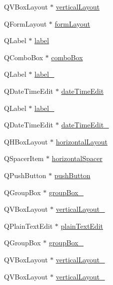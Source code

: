 \begin{DoxyCompactItemize}
\item 
Q\+V\+Box\+Layout $\ast$ \hyperlink{class_ui___client_view_a6df61dc527c8a16c99264dc76664a0e7}{vertical\+Layout}
\item 
Q\+Form\+Layout $\ast$ \hyperlink{class_ui___client_view_aeb4ca2ecc409a09602ed2d98d124a65f}{form\+Layout}
\item 
Q\+Label $\ast$ \hyperlink{class_ui___client_view_a65f087e517845c4943ada68765528b7c}{label}
\item 
Q\+Combo\+Box $\ast$ \hyperlink{class_ui___client_view_a4272861ad4c5565d62485516b5fc046f}{combo\+Box}
\item 
Q\+Label $\ast$ \hyperlink{class_ui___client_view_a4b3b712ef57c0b26b0cf24fb673ef215}{label\+\_}
\item 
Q\+Date\+Time\+Edit $\ast$ \hyperlink{class_ui___client_view_a3ca4d48937a0662ed8ec86ce0e31394f}{date\+Time\+Edit}
\item 
Q\+Label $\ast$ \hyperlink{class_ui___client_view_a4cc717778a48b972383c7e9c57c9312d}{label\+\_}
\item 
Q\+Date\+Time\+Edit $\ast$ \hyperlink{class_ui___client_view_a5da3b627c41c81ffd0cee3714f85bdfa}{date\+Time\+Edit\+\_}
\item 
Q\+H\+Box\+Layout $\ast$ \hyperlink{class_ui___client_view_a508aef0ee91fd84825dbc5c8aa7cdeb0}{horizontal\+Layout}
\item 
Q\+Spacer\+Item $\ast$ \hyperlink{class_ui___client_view_aa7dcb0d8ab4f0405994e9e0fa7e989c2}{horizontal\+Spacer}
\item 
Q\+Push\+Button $\ast$ \hyperlink{class_ui___client_view_ab0bc490a387f6e96e63bc12e2994fd13}{push\+Button}
\item 
Q\+Group\+Box $\ast$ \hyperlink{class_ui___client_view_a7ca21148a8e0fbaad7a8f2ec0ccf0926}{group\+Box\+\_}
\item 
Q\+V\+Box\+Layout $\ast$ \hyperlink{class_ui___client_view_a3398ddbbfccc42f0427b2f58894fc727}{vertical\+Layout\+\_}
\item 
Q\+Plain\+Text\+Edit $\ast$ \hyperlink{class_ui___client_view_a4cb26f24cf265d02d4d60bd7f7c62547}{plain\+Text\+Edit}
\item 
Q\+Group\+Box $\ast$ \hyperlink{class_ui___client_view_a02e54e94498bea8c809e2c45c447b62e}{group\+Box\+\_}
\item 
Q\+V\+Box\+Layout $\ast$ \hyperlink{class_ui___client_view_ac172cec975a952bffc95a5d26e75cb05}{vertical\+Layout\+\_}
\item 
Q\+V\+Box\+Layout $\ast$ \hyperlink{class_ui___client_view_a3b7c797d484375f1404408e0fcf7d50b}{vertical\+Layout\+\_}

\end{DoxyCompactItemize}
